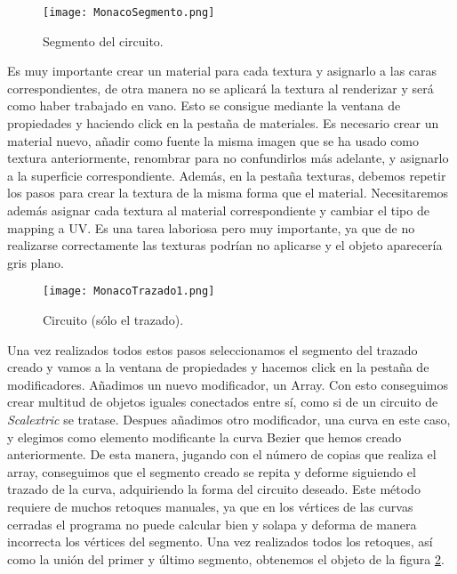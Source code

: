 \begin{figure}[h]
	\centering
	\texttt{[image: MonacoSegmento.png]}
	\caption{Segmento del circuito.} \label{fig:monacosegmento}
\end{figure}

Es muy importante crear un material para cada textura y asignarlo a las caras correspondientes, de otra manera no se aplicará la textura al renderizar y será como haber trabajado en vano. Esto se consigue mediante la ventana de propiedades y haciendo click en la pestaña de materiales. Es necesario crear un material nuevo, añadir como fuente la misma imagen que se ha usado como textura anteriormente, renombrar para no confundirlos más adelante, y asignarlo a la superficie correspondiente. Además, en la pestaña texturas, debemos repetir los pasos para crear la textura de la misma forma que el material. Necesitaremos además asignar cada textura al material correspondiente y cambiar el tipo de mapping a UV. Es una tarea laboriosa pero muy importante, ya que de no realizarse correctamente las texturas podrían no aplicarse y el objeto aparecería gris plano.

\begin{figure}[hb]
	\centering
	\texttt{[image: MonacoTrazado1.png]}
	\caption{Circuito (sólo el trazado).} \label{fig:monacotrazado1}
\end{figure}

Una vez realizados todos estos pasos seleccionamos el segmento del trazado creado y vamos a la ventana de propiedades y hacemos click en la pestaña de modificadores. Añadimos un nuevo modificador, un Array. Con esto conseguimos crear multitud de objetos iguales conectados entre sí, como si de un circuito de \textit{Scalextric} se tratase. Despues añadimos otro modificador, una curva en este caso, y elegimos como elemento modificante la curva Bezier que hemos creado anteriormente. De esta manera, jugando con el número de copias que realiza el array, conseguimos que el segmento creado se repita y deforme siguiendo el trazado de la curva, adquiriendo la forma del circuito deseado. Este método requiere de muchos retoques manuales, ya que en los vértices de las curvas cerradas el programa no puede calcular bien y solapa y deforma de manera incorrecta los vértices del segmento. Una vez realizados todos los retoques, así como la unión del primer y último segmento, obtenemos el objeto de la figura \ref{fig:monacotrazado1}.

